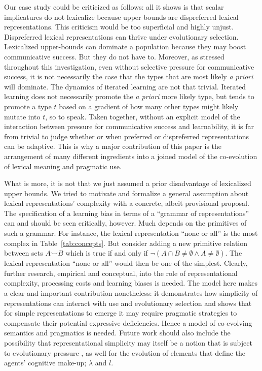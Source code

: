 \documentclass[a4paper, 11pt]{article}
\theoremstyle{Satz}
\begin{document}
Our case study could be criticized as follows: all it shows is that scalar implicatures do not
lexicalize because upper bounds are dispreferred lexical representations. This criticism would be too
superficial and highly unjust. Dispreferred lexical representations can thrive under evolutionary
selection. Lexicalized upper-bounds can dominate a population because they may boost
communicative success. But they do not have to. Moreover, as stressed throughout this investigation, even without selective pressure
for communicative success, it is not necessarily the case that the types that are most
likely \emph{a priori} will dominate. The dynamics of iterated learning are not that
trivial. Iterated learning does not necessarily promote the \emph{a priori} more likely type,
but tends to promote a type $t$ based on a gradient of how many other types might likely mutate
into $t$, so to speak. Taken together, without an explicit model of the interaction between
pressure for communicative success and learnability, it is far from trivial to judge whether or when
preferred or dispreferred representations can be adaptive. This is why a major contribution of this
paper is the arrangement of many different ingredients into a joined model of the co-evolution
of lexical meaning and pragmatic use. 

What is more, it is not that we just assumed a prior disadvantage of lexicalized upper
bounds. We tried to motivate and formalize a general assumption about lexical representations'
complexity with a concrete, albeit provisional proposal. The specification of a learning bias
in terms of a ``grammar of representations'' can and should be seen critically, however. Much
depends on the primitives of such a grammar. For instance, the lexical representation ``none or
all'' is the most complex in Table~\ref{tab:concepts}. But consider adding a new primitive
relation between sets $A \smile B$ which is true if and only if
$\neg(A \cap B \neq \emptyset \wedge A \neq \emptyset)$. The lexical representation ``none or
all'' would then be one of the simplest. Clearly, further research, empirical and conceptual,
into the role of representational complexity, processing costs and learning biases is
needed. The model here makes a clear and important contribution nonetheless: it demonstrates
how simplicity of representations can interact with use and evolutionary selection and shows
that for simple representations to emerge it may require pragmatic strategies to compensate
their potential expressive deficiencies. Hence a model of co-evolving semantics and pragmatics is
needed. Future work should also include the possibility that representational simplicity may
itself be a notion that is subject to evolutionary pressure
\citep[cf.][]{ThompsonKirby2016:Culture-Shapes-}, as well for the evolution of elements that define
the agents' cognitive make-up; $\lambda$ and $l$.
\end{document}
